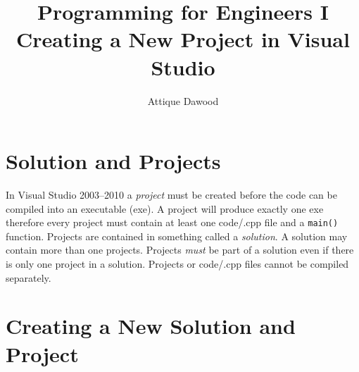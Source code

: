 \documentclass{article}
\title{Programming for Engineers I\\Creating a New Project in Visual Studio}
\author{Attique Dawood}
\begin{document}
\maketitle

\section{Solution and Projects}
In Visual Studio 2003--2010 a \emph{project} must be created before the code can be compiled into an executable (exe). A project will produce exactly one exe therefore every project must contain at least one code/.cpp file and a \verb|main()| function. Projects are contained in something called a \emph{solution}. A solution may contain more than one projects. Projects \emph{must} be part of a solution even if there is only one project in a solution. Projects or code/.cpp files cannot be compiled separately.

\section{Creating a New Solution and Project}
\end{document}
